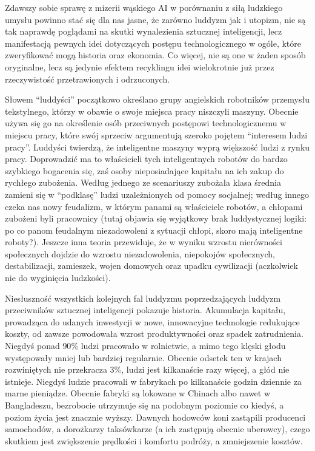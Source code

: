 \documentclass[10pt,a4paper]{article}
\begin{document}
	\par Zdawszy sobie sprawę z mizerii wąskiego AI w porównaniu z siłą ludzkiego umysłu powinno stać się dla nas jasne, że zarówno luddyzm jak i utopizm, nie są tak naprawdę poglądami na skutki wynalezienia sztucznej inteligencji, lecz manifestacją pewnych idei dotyczących postępu technologicznego w ogóle, które zweryfikować mogą historia oraz ekonomia. Co więcej, nie są one w żaden sposób oryginalne, lecz są jedynie efektem recyklingu idei wielokrotnie już przez rzeczywistość przetrawionych i odrzuconych.
	\par Słowem ``luddyści'' początkowo określano grupy angielskich robotników przemysłu tekstylnego, którzy w obawie o swoje miejsca pracy niszczyli maszyny. Obecnie używa się go na określenie osób przeciwnych postępowi technologicznemu w miejscu pracy, które swój sprzeciw argumentują szeroko pojętem ``interesem ludzi pracy''. Luddyści twierdzą, że inteligentne maszyny wyprą większość ludzi z rynku pracy. Doprowadzić ma to właścicieli tych inteligentnych robotów do bardzo szybkiego bogacenia się, zaś osoby nieposiadające kapitału na ich zakup do rychłego zubożenia. Według jednego ze scenariuszy zubożała klasa średnia zamieni się w ``podklasę'' ludzi uzależnionych od pomocy socjalnej; według innego czeka nas nowy feudalizm, w którym panami są właściciele robotów, a chłopami zubożeni byli pracownicy (tutaj objawia się wyjątkowy brak luddystycznej logiki: po co panom feudalnym niezadowoleni z sytuacji chłopi, skoro mają inteligentne roboty?). Jeszcze inna teoria przewiduje, że w wyniku wzrostu nierówności społecznych dojdzie do wzrostu niezadowolenia, niepokojów społecznych, destabilizacji, zamieszek, wojen domowych oraz upadku cywilizacji (aczkolwiek nie do wyginięcia ludzkości).
	\par Niesłuszność wszystkich kolejnych fal luddyzmu poprzedzających luddyzm przeciwników sztucznej inteligencji pokazuje historia. Akumulacja kapitału, prowadząca do udanych inwestycji w nowe, innowacyjne technologie redukujące koszty, od zawsze powodowała wzrost produktywności oraz spadek zatrudnienia. Niegdyś ponad $90\%$ ludzi pracowało w rolnictwie, a mimo tego klęski głodu występowały mniej lub bardziej regularnie. Obecnie odsetek ten w krajach rozwiniętych nie przekracza $3\%$, ludzi jest kilkanaście razy więcej, a głód nie istnieje. Niegdyś ludzie pracowali w fabrykach po kilkanaście godzin dziennie za marne pieniądze. Obecnie fabryki są lokowane w Chinach albo nawet w Bangladeszu, bezrobocie utrzymuje się na podobnym poziomie co kiedyś, a poziom życia jest znacznie wyższy. Dawnych hodowców koni zastąpili producenci samochodów, a dorożkarzy taksówkarze (a ich zastępują obecnie uberowcy), czego skutkiem jest zwiększenie prędkości i komfortu podróży, a zmniejszenie kosztów.
\end{document}
